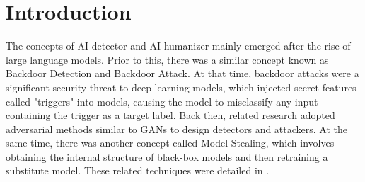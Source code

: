 \documentclass[nohyperref]{article}
\theoremstyle{plain}
\theoremstyle{definition}
\theoremstyle{remark}
\begin{document}

\begin{abstract}
This paper presents a comprehensive review of AI humanization techniques, which aim to make AI-generated content more natural and human-like. We examine current approaches including linguistic style transfer, semantic variation, and detection evasion methods. Our analysis covers both the technical foundations and practical applications of these techniques. We also discuss the ethical implications and potential risks associated with AI humanization technologies. This review provides researchers and practitioners with a systematic understanding of the state-of-the-art in this rapidly evolving field.
\end{abstract}

\section{Introduction}
\label{introduction}

The concepts of AI detector and AI humanizer mainly emerged after the rise of large language models. Prior to this, there was a similar concept known as Backdoor Detection and Backdoor Attack. At that time, backdoor attacks were a significant security threat to deep learning models, which injected secret features called "triggers" into models, causing the model to misclassify any input containing the trigger as a target label. Back then, related research adopted adversarial methods similar to GANs to design detectors and attackers. At the same time, there was another concept called Model Stealing, which involves obtaining the internal structure of black-box models and then retraining a substitute model. These related techniques were detailed in \cite{mengGradEscapeGradientBasedEvader2025}.


\end{document}
